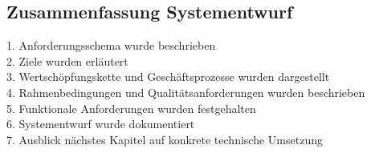 \subsection{Zusammenfassung Systementwurf}
1. Anforderungsschema wurde beschrieben\\
2. Ziele wurden erläutert\\
3. Wertschöpfungskette und Geschäftsprozesse wurden dargestellt\\
4. Rahmenbedingungen und Qualitätsanforderungen wurden beschrieben\\
5. Funktionale Anforderungen wurden festgehalten\\
6. Systementwurf wurde dokumentiert\\
7. Ausblick nächstes Kapitel auf konkrete technische Umsetzung

\newpage
